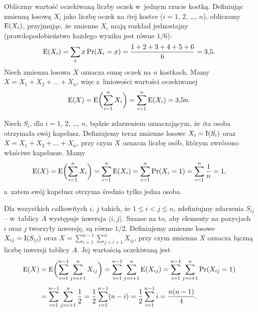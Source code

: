 \exercise %
Obliczmy wartość oczekiwaną liczby oczek w~jednym rzucie kostką.
Definiując zmienną losową $X_i$ jako liczbę oczek na $i$\nbhyphen tej kostce ($i=1$, 2, \dots, $n$), obliczamy $\operatorname{E}(X_i)$, przyjmując, że zmienne $X_i$ mają rozkład jednostajny (prawdopodobieństwo każdego wyniku jest równe $1/6$):
\[
	\operatorname{E}(X_i) = \sum_xx\Pr(X_i=x) = \frac{1+2+3+4+5+6}{6} = 3{,}5.
\]
Niech zmienna losowa $X$ oznacza sumę oczek na $n$ kostkach.
Mamy $X=X_1+X_2+\dots+X_n$, więc z~liniowości wartości oczekiwanej
\[
	\operatorname{E}(X) = \operatorname{E}\biggl(\sum_{i=1}^nX_i\biggr) = \sum_{i=1}^n\operatorname{E}(X_i) = 3{,}5n.
\]

\exercise %
Niech $S_i$, dla $i=1$, 2, \dots, $n$, będzie zdarzeniem oznaczającym, że $i$\nbhyphen ta osoba otrzymała swój kapelusz.
Definiujemy teraz zmienne losowe $X_i=\operatorname{I}(S_i)$ oraz $X=X_1+X_2+\dots+X_n$, przy czym $X$ oznacza liczbę osób, którym zwrócono właściwe kapelusze.
Mamy
\[
	\operatorname{E}(X) = \operatorname{E}\biggl(\sum_{i=1}^nX_i\biggr) = \sum_{i=1}^n\operatorname{E}(X_i) = \sum_{i=1}^n\Pr(X_i=1) = \sum_{i=1}^n\frac{1}{n} = 1,
\]
a~zatem swój kapelusz otrzyma średnio tylko jedna osoba.

\exercise %
Dla wszystkich całkowitych $i$, $j$ takich, że $1\le i<j\le n$, zdefiniujmy zdarzenia $S_{ij}$ -- w~tablicy $A$ występuje inwersja $\langle i,j\rangle$.
Szanse na to, aby elementy na pozycjach $i$ oraz $j$ tworzyły inwersję, są równe $1/2$.
Definiujemy zmienne losowe $X_{ij}=\operatorname{I}(S_{ij})$ oraz $X=\sum_{i=1}^{n-1}\sum_{j=i+1}^nX_{ij}$, przy czym zmienna $X$ oznacza łączną liczbę inwersji tablicy $A$.
Jej wartością oczekiwaną jest
\begin{align*}
	\operatorname{E}(X) &= \operatorname{E}\biggl(\sum_{i=1}^{n-1}\sum_{j=i+1}^nX_{ij}\biggr) = \sum_{i=1}^{n-1}\sum_{j=i+1}^n\operatorname{E}(X_{ij}) = \sum_{i=1}^{n-1}\sum_{j=i+1}^n\Pr(X_{ij}=1) \\[1mm]
	&= \sum_{i=1}^{n-1}\sum_{j=i+1}^n\frac{1}{2} = \frac{1}{2}\sum_{i=1}^{n-1}(n-i) = \frac{1}{2}\sum_{i=1}^{n-1}i = \frac{n(n-1)}{4}.
\end{align*}
